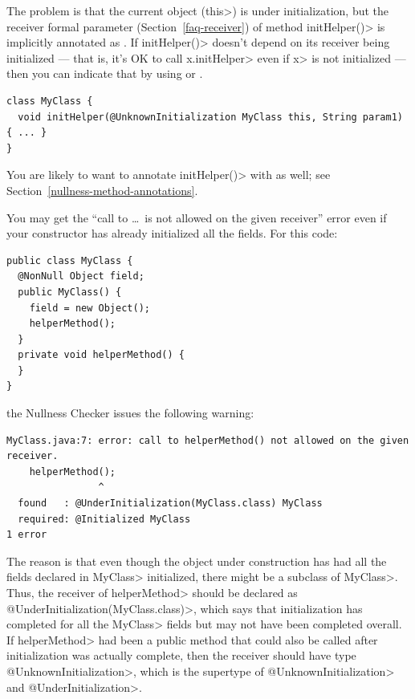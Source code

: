 The problem is that the current object (\<this>) is under initialization,
but the receiver formal parameter (Section~\ref{faq-receiver}) of method
\<initHelper()> is implicitly annotated as
.  If
\<initHelper()> doesn't depend on its receiver being initialized --- that
is, it's OK to call \<x.initHelper> even if \<x> is not initialized ---
then you can indicate that by using
 or
.

\begin{Verbatim}
class MyClass {
  void initHelper(@UnknownInitialization MyClass this, String param1) { ... }
}
\end{Verbatim}

\noindent
You are likely to want to annotate \<initHelper()> with
 as well; see
Section~\ref{nullness-method-annotations}.

You may get the ``call to \ldots\ is not allowed on the given receiver''
error even if your constructor has already initialized all the fields.
For this code:

\begin{Verbatim}
public class MyClass {
  @NonNull Object field;
  public MyClass() {
    field = new Object();
    helperMethod();
  }
  private void helperMethod() {
  }
}
\end{Verbatim}

\noindent
the Nullness Checker issues the following warning:

\begin{Verbatim}
MyClass.java:7: error: call to helperMethod() not allowed on the given receiver.
    helperMethod();
                ^
  found   : @UnderInitialization(MyClass.class) MyClass
  required: @Initialized MyClass
1 error
\end{Verbatim}

\begin{sloppypar}
The reason is that even though the object under construction has had all
the fields declared in \<MyClass> initialized, there might be a subclass of
\<MyClass>.  Thus, the receiver of \<helperMethod> should be declared as
\<@UnderInitialization(MyClass.class)>, which says that initialization has
completed for all the \<MyClass> fields but may not have been completed
overall.  If \<helperMethod> had been a public method that could also be called after
initialization was actually complete, then the receiver should have type
\<@UnknownInitialization>, which is the supertype of
\<@UnknownInitialization> and \<@UnderInitialization>.
\end{sloppypar}

